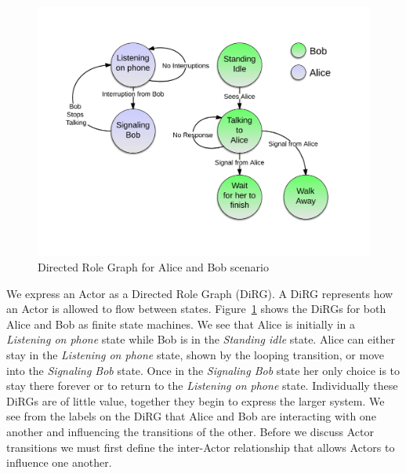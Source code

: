 \begin{figure}[h]
\begin{center}
\includegraphics[width=\textwidth]{ab_dirg.png}
\caption{Directed Role Graph for Alice and Bob scenario}
\label{fig:ab_dirg}
\end{center}
\end{figure}

We express an Actor as a Directed Role Graph (DiRG).  A DiRG represents how an Actor is allowed to flow between states.  Figure~\ref{fig:ab_dirg} shows the DiRGs for both Alice and Bob as finite state machines.  We see that Alice is initially in a {\em Listening on phone} state while Bob is in the {\em Standing idle} state.  Alice can either stay in the {\em Listening on phone} state, shown by the looping transition, or move into the {\em Signaling Bob} state.  Once in the {\em Signaling Bob} state her only choice is to stay there forever or to return to the {\em Listening on phone} state.  Individually these DiRGs are of little value, together they begin to express the larger system.  We see from the labels on the DiRG that Alice and Bob are interacting with one another and influencing the transitions of the other.  Before we discuss Actor transitions we must first define the inter-Actor relationship that allows Actors to influence one another.


